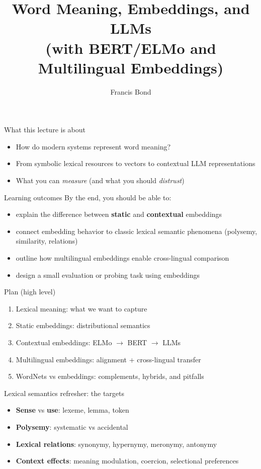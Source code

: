\documentclass{beamer}
\title[Lexical meaning in the LLM era]{Word Meaning, Embeddings, and LLMs\\(with BERT/ELMo and Multilingual Embeddings)}
\author{Francis Bond}
\institute{Methods in Lexical Semantics (LOT / RM / PhD)}
\date{}
\begin{document}
\begin{frame}
  \titlepage
\end{frame}

\begin{frame}{What this lecture is about}
\begin{itemize}
  \item How do modern systems represent word meaning?
  \item From symbolic lexical resources to vectors to contextual LLM representations
  \item What you can \emph{measure} (and what you should \emph{distrust})
\end{itemize}
\end{frame}

\begin{frame}{Learning outcomes}
By the end, you should be able to:
\begin{itemize}
  \item explain the difference between \textbf{static} and \textbf{contextual} embeddings
  \item connect embedding behavior to classic lexical semantic phenomena (polysemy, similarity, relations)
  \item outline how multilingual embeddings enable cross-lingual comparison
  \item design a small evaluation or probing task using embeddings
\end{itemize}
\end{frame}

\begin{frame}{Plan (high level)}
\begin{enumerate}
  \item Lexical meaning: what we want to capture
  \item Static embeddings: distributional semantics
  \item Contextual embeddings: ELMo $\rightarrow$ BERT $\rightarrow$ LLMs
  \item Multilingual embeddings: alignment + cross-lingual transfer
  \item WordNets vs embeddings: complements, hybrids, and pitfalls
\end{enumerate}
\end{frame}

\begin{frame}{Lexical semantics refresher: the targets}
\begin{itemize}
  \item \textbf{Sense} vs \textbf{use}: lexeme, lemma, token
  \item \textbf{Polysemy}: systematic vs accidental
  \item \textbf{Lexical relations}: synonymy, hypernymy, meronymy, antonymy
  \item \textbf{Context effects}: meaning modulation, coercion, selectional preferences
\end{itemize}
\end{frame}
\end{document}
